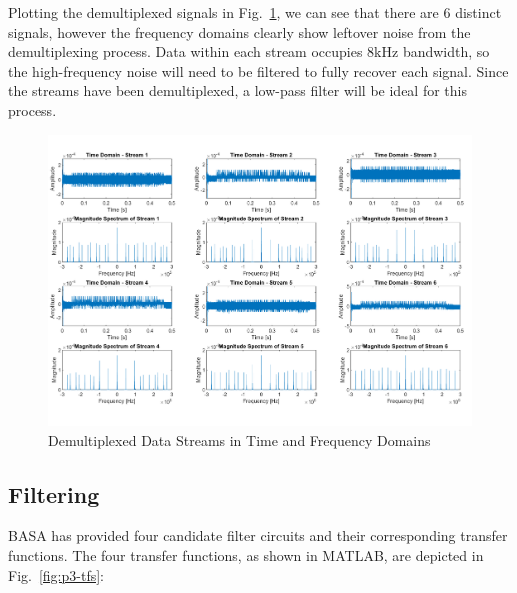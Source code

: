\documentclass[12pt]{article}
\numberwithin{equation}{section}
\numberwithin{figure}{section}
\numberwithin{table}{section}
\begin{document}
Plotting the demultiplexed signals in Fig.~\ref{fig:p3-demultiplexed}, we can
see that there are 6 distinct signals, however the frequency domains clearly
show leftover noise from the demultiplexing process. Data within each stream
occupies 8kHz bandwidth, so the high-frequency noise will need to be filtered
to fully recover each signal. Since the streams have been demultiplexed, a
low-pass filter will be ideal for this process.
\begin{figure}[ht]
    \centering
    \includegraphics[width=\textwidth]{figures/p3-demultiplexed.png}
    \caption{Demultiplexed Data Streams in Time and Frequency Domains\label{fig:p3-demultiplexed}}
\end{figure}

\pagebreak
\subsection{Filtering}
BASA has provided four candidate filter circuits and their corresponding
transfer functions. The four transfer functions, as shown in MATLAB, are
depicted in Fig.~\ref{fig:p3-tfs}:
\end{document}
